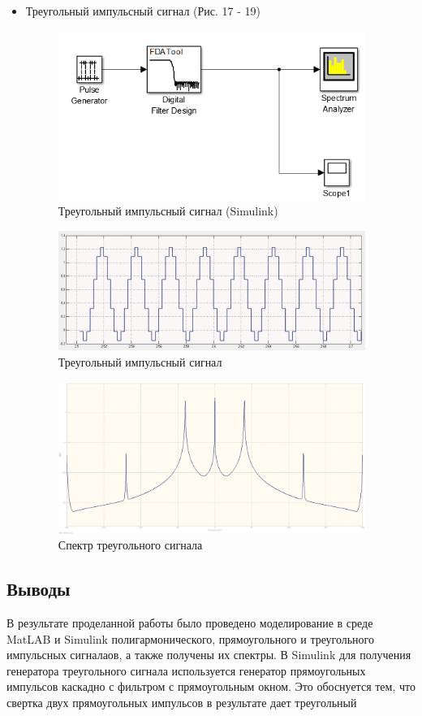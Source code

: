 \documentclass[10pt,a4paper]{article}
\begin{document}
\begin{itemize}
\item Треугольный импульсный сигнал (Рис. 17 - 19)
\begin{figure}[h]
\centering
\includegraphics[width=10cm]{4_simulink} 
\caption{Треугольный импульсный сигнал (Simulink)} 
\label{fig.l5_7s} 
\end{figure}
\begin{figure}[h]
\centering
\includegraphics[width=10cm]{lab5_5_simulink} 
\caption{Треугольный импульсный сигнал} 
\label{fig.l5_8s} 
\end{figure}
\begin{figure}[h]
\centering
\includegraphics[width=10cm]{lab5_6_simulink}
\caption{Спектр треугольного сигнала} 
\label{fig.l5_9s} 
\end{figure}
\end{itemize}
\subsection{Выводы}
В результате проделанной работы было проведено моделирование в среде MatLAB и Simulink полигармонического, прямоугольного и треугольного импульсных сигналаов, а также получены их спектры. В Simulink для получения генератора треугольного сигнала используется генератор прямоугольных импульсов каскадно с фильтром с прямоугольным окном. Это обоснуется тем, что свертка двух прямоугольных импульсов в результате дает треугольный 
\end{document}
